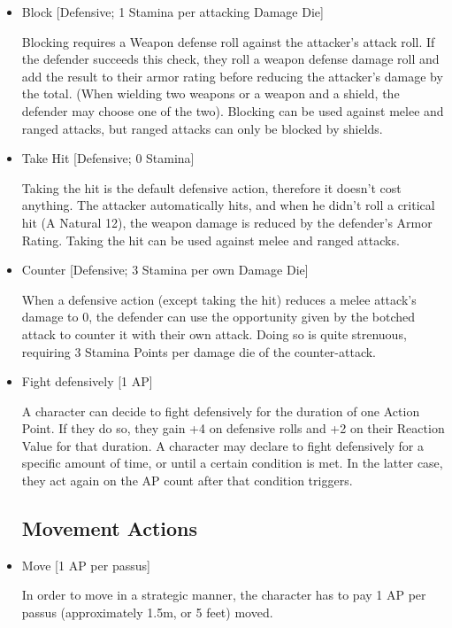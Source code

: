 \begin{itemize}
\item Block [Defensive; 1 Stamina per attacking Damage Die]

Blocking requires a Weapon defense roll against the attacker's attack roll. If the defender succeeds this check, they roll a weapon defense damage roll and add the result to their armor rating before reducing the attacker’s damage by the total. (When wielding two weapons or a weapon and a shield, the defender may choose one of the two). Blocking can be used against melee and ranged attacks, but ranged attacks can only be blocked by shields.



\item Take Hit [Defensive; 0 Stamina]

Taking the hit is the default defensive action, therefore it doesn’t cost anything. The attacker automatically hits, and when he didn’t roll a critical hit (A Natural 12), the weapon damage is reduced by the defender’s Armor Rating. Taking the hit can be used against melee and ranged attacks.



\item Counter [Defensive; 3 Stamina per own Damage Die]

When a defensive action (except taking the hit) reduces a melee attack's damage to 0, the defender can use the opportunity given by the botched attack to counter it with their own attack. Doing so is quite strenuous, requiring 3 Stamina Points per damage die of the counter-attack.



\item Fight defensively [1 AP]

A character can decide to fight defensively for the duration of one Action Point. If they do so, they gain +4 on defensive rolls and +2 on their Reaction Value for that duration. A character may declare to fight defensively for a specific amount of time, or until a certain condition is met. In the latter case, they act again on the AP count after that condition triggers.


\subsection{Movement Actions}

\item Move [1 AP per passus]

In order to move in a strategic manner, the character has to pay 1 AP per passus (approximately 1.5m, or 5 feet) moved. 




\end{itemize}
